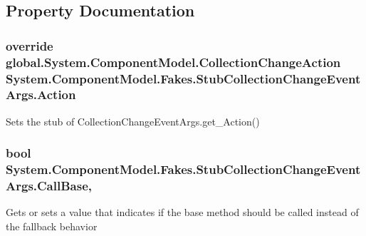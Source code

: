 \subsection{Property Documentation}
\hypertarget{class_system_1_1_component_model_1_1_fakes_1_1_stub_collection_change_event_args_a24de97ffff8ab3f071af844251531c23}{
\subsubsection[{Action}]{\setlength{\rightskip}{0pt plus 5cm}override global.\-System.\-Component\-Model.\-Collection\-Change\-Action System.\-Component\-Model.\-Fakes.\-Stub\-Collection\-Change\-Event\-Args.\-Action\hspace{0.3cm}{\ttfamily [get]}}}\label{class_system_1_1_component_model_1_1_fakes_1_1_stub_collection_change_event_args_a24de97ffff8ab3f071af844251531c23}


Sets the stub of Collection\-Change\-Event\-Args.\-get\-\_\-\-Action()

\hypertarget{class_system_1_1_component_model_1_1_fakes_1_1_stub_collection_change_event_args_a7a5f96e01c663f9ef5e8da30a50cc3e0}{
\subsubsection[{Call\-Base}]{\setlength{\rightskip}{0pt plus 5cm}bool System.\-Component\-Model.\-Fakes.\-Stub\-Collection\-Change\-Event\-Args.\-Call\-Base\hspace{0.3cm}{\ttfamily [get]}, {\ttfamily [set]}}}\label{class_system_1_1_component_model_1_1_fakes_1_1_stub_collection_change_event_args_a7a5f96e01c663f9ef5e8da30a50cc3e0}


Gets or sets a value that indicates if the base method should be called instead of the fallback behavior

